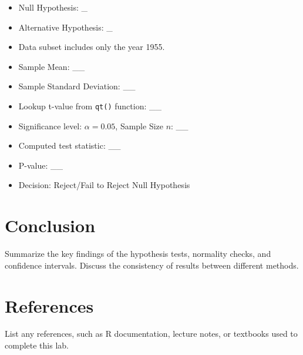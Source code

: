\documentclass{article}
\begin{document}
\begin{itemize}
    \item Null Hypothesis: \_
    \item Alternative Hypothesis: \_
    \item Data subset includes only the year 1955.
    \item Sample Mean: \_\_
    \item Sample Standard Deviation: \_\_
    \item Lookup t-value from \texttt{qt()} function: \_\_
    \item Significance level: \(\alpha = 0.05\), Sample Size \(n\): \_\_
    \item Computed test statistic: \_\_
    \item P-value: \_\_
    \item Decision: Reject/Fail to Reject Null Hypothesis
\end{itemize}

\section{Conclusion}
Summarize the key findings of the hypothesis tests, normality checks, and confidence intervals. Discuss the consistency of results between different methods.

\section{References}
List any references, such as R documentation, lecture notes, or textbooks used to complete this lab.
\end{document}
